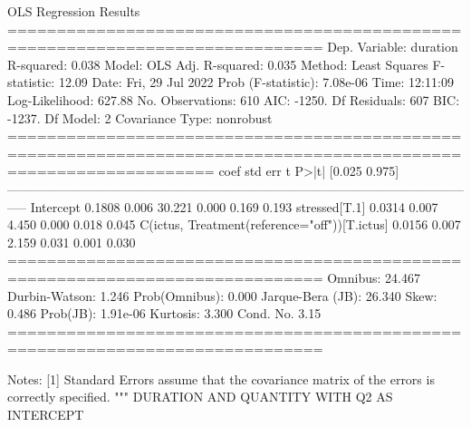 OLS Regression Results  \\                          
==============================================================================
Dep. Variable:               duration   R-squared:                       0.038
Model:                            OLS   Adj. R-squared:                  0.035
Method:                 Least Squares   F-statistic:                     12.09
Date:                Fri, 29 Jul 2022   Prob (F-statistic):           7.08e-06
Time:                        12:11:09   Log-Likelihood:                 627.88
No. Observations:                 610   AIC:                            -1250.
Df Residuals:                     607   BIC:                            -1237.
Df Model:                           2                                         
Covariance Type:            nonrobust                                         
=================================================================================================================
                                                    coef    std err          t      P>|t|      [0.025      0.975]
-----------------------------------------------------------------------------------------------------------------
Intercept                                         0.1808      0.006     30.221      0.000       0.169       0.193
stressed[T.1]                                     0.0314      0.007      4.450      0.000       0.018       0.045
C(ictus, Treatment(reference="off"))[T.ictus]     0.0156      0.007      2.159      0.031       0.001       0.030
==============================================================================
Omnibus:                       24.467   Durbin-Watson:                   1.246
Prob(Omnibus):                  0.000   Jarque-Bera (JB):               26.340
Skew:                           0.486   Prob(JB):                     1.91e-06
Kurtosis:                       3.300   Cond. No.                         3.15
==============================================================================

Notes:
[1] Standard Errors assume that the covariance matrix of the errors is correctly specified.
"""
DURATION AND QUANTITY WITH Q2 AS INTERCEPT \\

